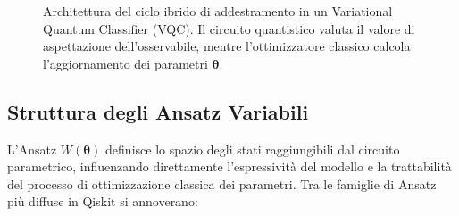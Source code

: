 \begin{figure}[htbp]
    \centering
    \caption{\footnotesize Architettura del ciclo ibrido di addestramento in un Variational Quantum Classifier (VQC). Il circuito quantistico valuta il valore di aspettazione dell'osservabile, mentre l'ottimizzatore classico calcola l'aggiornamento dei parametri $\boldsymbol{\theta}$.}
    \label{fig:vqc_hybrid_loop}
\end{figure}

\subsection{Struttura degli Ansatz Variabili}
L'Ansatz $W(\boldsymbol{\theta})$ definisce lo spazio degli stati raggiungibili dal circuito parametrico, influenzando direttamente l'espressività del modello e la trattabilità del processo di ottimizzazione classica dei parametri. Tra le famiglie di Ansatz più diffuse in Qiskit si annoverano:

